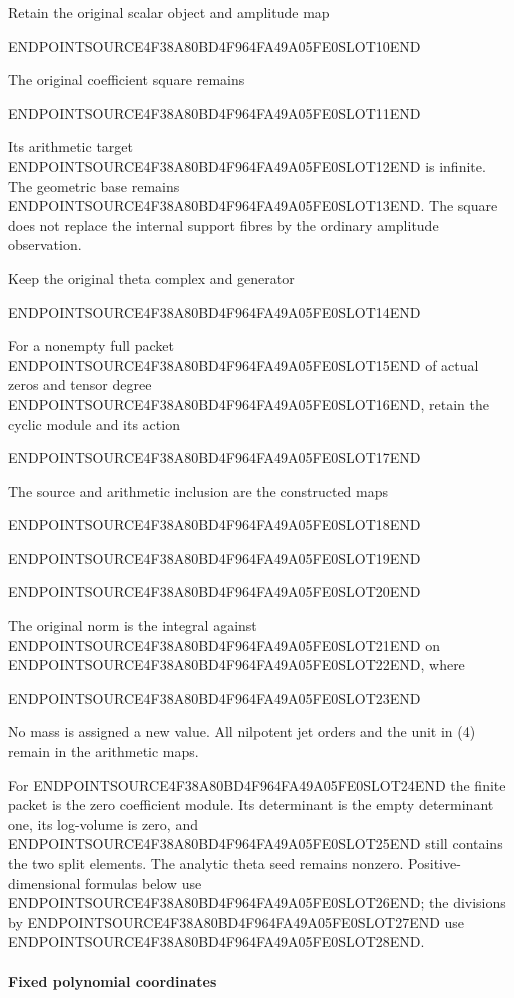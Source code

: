 Retain the original scalar object and amplitude map

ENDPOINTSOURCE4F38A80BD4F964FA49A05FE0SLOT10END

The original coefficient square remains

ENDPOINTSOURCE4F38A80BD4F964FA49A05FE0SLOT11END

Its arithmetic target ENDPOINTSOURCE4F38A80BD4F964FA49A05FE0SLOT12END is infinite. The geometric base remains ENDPOINTSOURCE4F38A80BD4F964FA49A05FE0SLOT13END. The square does not replace the internal support fibres by the ordinary amplitude observation.

Keep the original theta complex and generator

ENDPOINTSOURCE4F38A80BD4F964FA49A05FE0SLOT14END

For a nonempty full packet ENDPOINTSOURCE4F38A80BD4F964FA49A05FE0SLOT15END of actual zeros and tensor degree ENDPOINTSOURCE4F38A80BD4F964FA49A05FE0SLOT16END, retain the cyclic module and its action

ENDPOINTSOURCE4F38A80BD4F964FA49A05FE0SLOT17END

The source and arithmetic inclusion are the constructed maps

ENDPOINTSOURCE4F38A80BD4F964FA49A05FE0SLOT18END

ENDPOINTSOURCE4F38A80BD4F964FA49A05FE0SLOT19END

ENDPOINTSOURCE4F38A80BD4F964FA49A05FE0SLOT20END

The original norm is the integral against ENDPOINTSOURCE4F38A80BD4F964FA49A05FE0SLOT21END on ENDPOINTSOURCE4F38A80BD4F964FA49A05FE0SLOT22END, where

ENDPOINTSOURCE4F38A80BD4F964FA49A05FE0SLOT23END

No mass is assigned a new value. All nilpotent jet orders and the unit in (4) remain in the arithmetic maps.

For ENDPOINTSOURCE4F38A80BD4F964FA49A05FE0SLOT24END the finite packet is the zero coefficient module. Its determinant is the empty determinant one, its log-volume is zero, and ENDPOINTSOURCE4F38A80BD4F964FA49A05FE0SLOT25END still contains the two split elements. The analytic theta seed remains nonzero. Positive-dimensional formulas below use ENDPOINTSOURCE4F38A80BD4F964FA49A05FE0SLOT26END; the divisions by ENDPOINTSOURCE4F38A80BD4F964FA49A05FE0SLOT27END use ENDPOINTSOURCE4F38A80BD4F964FA49A05FE0SLOT28END.

\paragraph{Fixed polynomial coordinates}\label{endpoint-relation_moment_original--fixed-polynomial-coordinates}

